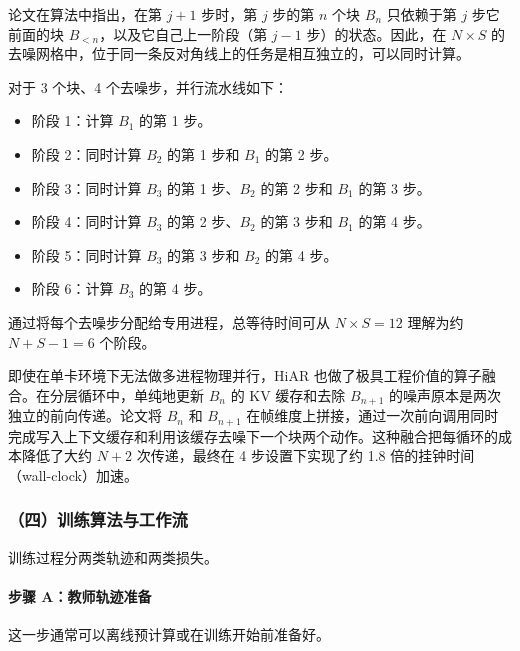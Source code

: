 论文在算法中指出，在第 \(j+1\) 步时，第 \(j\) 步的第 \(n\) 个块 \(B_n\) 只依赖于第 \(j\) 步它前面的块 \(B_{\lt n}\)，以及它自己上一阶段（第 \(j-1\) 步）的状态。因此，在 \(N\times S\) 的去噪网格中，位于同一条反对角线上的任务是相互独立的，可以同时计算。

对于 3 个块、4 个去噪步，并行流水线如下：

\begin{itemize}
\tightlist
\item
  阶段 1：计算 \(B_1\) 的第 1 步。
\item
  阶段 2：同时计算 \(B_2\) 的第 1 步和 \(B_1\) 的第 2 步。
\item
  阶段 3：同时计算 \(B_3\) 的第 1 步、\(B_2\) 的第 2 步和 \(B_1\) 的第 3 步。
\item
  阶段 4：同时计算 \(B_3\) 的第 2 步、\(B_2\) 的第 3 步和 \(B_1\) 的第 4 步。
\item
  阶段 5：同时计算 \(B_3\) 的第 3 步和 \(B_2\) 的第 4 步。
\item
  阶段 6：计算 \(B_3\) 的第 4 步。
\end{itemize}

通过将每个去噪步分配给专用进程，总等待时间可从 \(N\times S=12\) 理解为约 \(N+S-1=6\) 个阶段。

即使在单卡环境下无法做多进程物理并行，HiAR 也做了极具工程价值的算子融合。在分层循环中，单纯地更新 \(B_n\) 的 KV 缓存和去除 \(B_{n+1}\) 的噪声原本是两次独立的前向传递。论文将 \(B_n\) 和 \(B_{n+1}\) 在帧维度上拼接，通过一次前向调用同时完成写入上下文缓存和利用该缓存去噪下一个块两个动作。这种融合把每循环的成本降低了大约 \(N+2\) 次传递，最终在 4 步设置下实现了约 1.8 倍的挂钟时间（wall-clock）加速。

\hypertarget{ux56dbux8badux7ec3ux7b97ux6cd5ux4e0eux5de5ux4f5cux6d41}{%
\subsubsection{（四）训练算法与工作流}\label{ux56dbux8badux7ec3ux7b97ux6cd5ux4e0eux5de5ux4f5cux6d41}}

训练过程分两类轨迹和两类损失。

\hypertarget{ux6b65ux9aa4-aux6559ux5e08ux8f68ux8ff9ux51c6ux5907}{%
\paragraph{步骤 A：教师轨迹准备}\label{ux6b65ux9aa4-aux6559ux5e08ux8f68ux8ff9ux51c6ux5907}}

这一步通常可以离线预计算或在训练开始前准备好。

